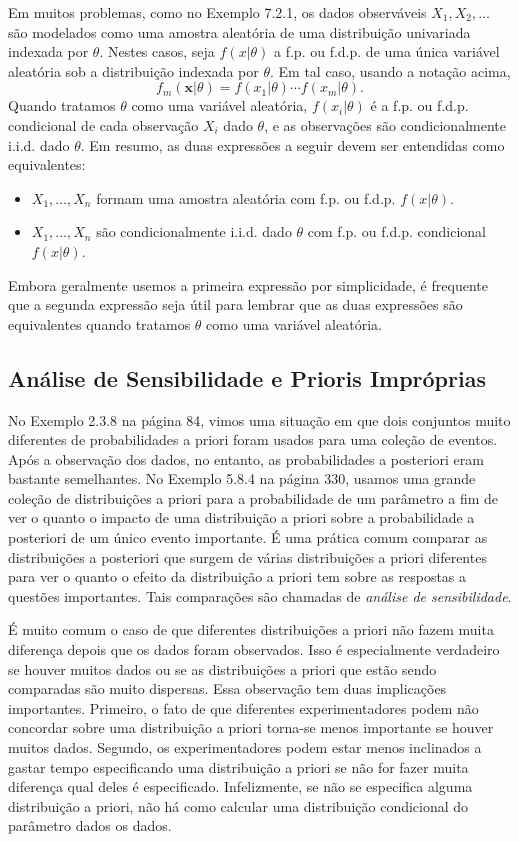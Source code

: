 Em muitos problemas, como no Exemplo 7.2.1, os dados observáveis $X_1, X_2, \dots$ são modelados como uma amostra aleatória de uma distribuição univariada indexada por $\theta$. Nestes casos, seja $f(x|\theta)$ a f.p. ou f.d.p. de uma única variável aleatória sob a distribuição indexada por $\theta$. Em tal caso, usando a notação acima,
$$ f_m(\mathbf{x}|\theta) = f(x_1|\theta) \cdots f(x_m|\theta). $$
Quando tratamos $\theta$ como uma variável aleatória, $f(x_i|\theta)$ é a f.p. ou f.d.p. condicional de cada observação $X_i$ dado $\theta$, e as observações são condicionalmente i.i.d. dado $\theta$. Em resumo, as duas expressões a seguir devem ser entendidas como equivalentes:
\begin{itemize}
    \item $X_1, \dots, X_n$ formam uma amostra aleatória com f.p. ou f.d.p. $f(x|\theta)$.
    \item $X_1, \dots, X_n$ são condicionalmente i.i.d. dado $\theta$ com f.p. ou f.d.p. condicional $f(x|\theta)$.
\end{itemize}
Embora geralmente usemos a primeira expressão por simplicidade, é frequente que a segunda expressão seja útil para lembrar que as duas expressões são equivalentes quando tratamos $\theta$ como uma variável aleatória.

\subsection*{Análise de Sensibilidade e Prioris Impróprias}

No Exemplo 2.3.8 na página 84, vimos uma situação em que dois conjuntos muito diferentes de probabilidades a priori foram usados para uma coleção de eventos. Após a observação dos dados, no entanto, as probabilidades a posteriori eram bastante semelhantes. No Exemplo 5.8.4 na página 330, usamos uma grande coleção de distribuições a priori para a probabilidade de um parâmetro a fim de ver o quanto o impacto de uma distribuição a priori sobre a probabilidade a posteriori de um único evento importante. É uma prática comum comparar as distribuições a posteriori que surgem de várias distribuições a priori diferentes para ver o quanto o efeito da distribuição a priori tem sobre as respostas a questões importantes. Tais comparações são chamadas de \textit{análise de sensibilidade}.

É muito comum o caso de que diferentes distribuições a priori não fazem muita diferença depois que os dados foram observados. Isso é especialmente verdadeiro se houver muitos dados ou se as distribuições a priori que estão sendo comparadas são muito dispersas. Essa observação tem duas implicações importantes. Primeiro, o fato de que diferentes experimentadores podem não concordar sobre uma distribuição a priori torna-se menos importante se houver muitos dados. Segundo, os experimentadores podem estar menos inclinados a gastar tempo especificando uma distribuição a priori se não for fazer muita diferença qual deles é especificado. Infelizmente, se não se especifica alguma distribuição a priori, não há como calcular uma distribuição condicional do parâmetro dados os dados.

